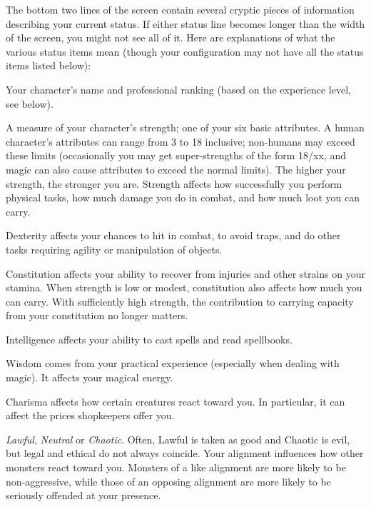 The bottom two lines of the screen contain several cryptic pieces of
information describing your current status.  If either status line
becomes longer than the width of the screen, you might not see all of
it.  Here are explanations of what the various status items mean
(though your configuration may not have all the status items listed
below):

\blist{}
\item[\bb{Rank}]
Your character's name and professional ranking (based on the
experience level, see below).
\item[\bb{Strength}]
A measure of your character's strength; one of your six basic
attributes.  A human character's attributes can range from 3 to 18 inclusive;
non-humans may exceed these limits
(occasionally you may get super-strengths of the form 18/xx, and magic can
also cause attributes to exceed the normal limits).  The
higher your strength, the stronger you are.  Strength affects how
successfully you perform physical tasks, how much damage you do in
combat, and how much loot you can carry.
\item[\bb{Dexterity}]
Dexterity affects your chances to hit in combat, to avoid traps, and
do other tasks requiring agility or manipulation of objects.
\item[\bb{Constitution}]
Constitution affects your ability to recover from injuries and other
strains on your stamina.
When strength is low or modest, constitution also affects how much you
can carry.  With sufficiently high strength, the contribution to
carrying capacity from your constitution no longer matters.
\item[\bb{Intelligence}]
Intelligence affects your ability to cast spells and read spellbooks.
\item[\bb{Wisdom}]
Wisdom comes from your practical experience (especially when dealing with
magic).  It affects your magical energy.
\item[\bb{Charisma}]
Charisma affects how certain creatures react toward you.  In
particular, it can affect the prices shopkeepers offer you.
\item[\bb{Alignment}]
%
{\it Lawful}, {\it Neutral\/} or {\it Chaotic}.  Often, Lawful is
taken as good and Chaotic is evil, but legal and ethical do not always
coincide.  Your alignment influences how other
monsters react toward you.  Monsters of a like alignment are more likely
to be non-aggressive, while those of an opposing alignment are more likely
to be seriously offended at your presence.
